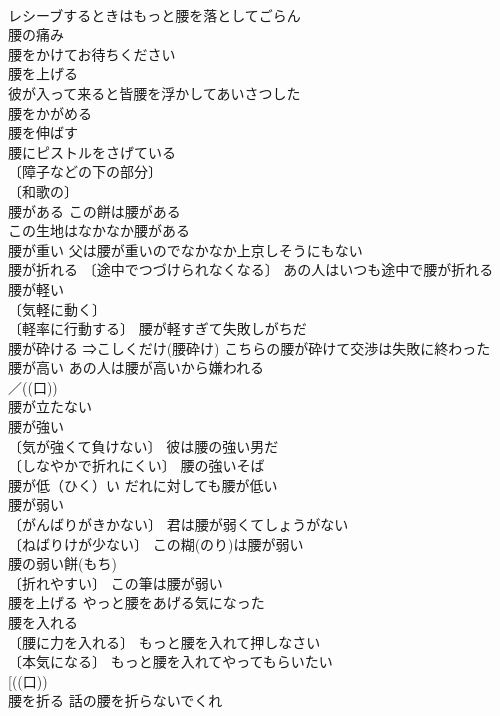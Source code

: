 \documentclass[8pt]{extreport}
\begin{document}
\begin{CJK}{UTF8}{min}
\\	レシーブするときはもっと腰を落としてごらん 
\\	腰の痛み 
\\	腰をかけてお待ちください 
\\	腰を上げる 
\\	彼が入って来ると皆腰を浮かしてあいさつした 
\\	腰をかがめる 
\\	腰を伸ばす 
\\	腰にピストルをさげている 
\\	〔障子などの下の部分〕
\\	〔和歌の〕
\\	腰がある この餅は腰がある 
\\	この生地はなかなか腰がある 
\\	腰が重い 父は腰が重いのでなかなか上京しそうにもない 
\\	腰が折れる 〔途中でつづけられなくなる〕 あの人はいつも途中で腰が折れる 
\\	腰が軽い 
\\	〔気軽に動く〕
\\	〔軽率に行動する〕 腰が軽すぎて失敗しがちだ 
\\	腰が砕ける ⇒こしくだけ(腰砕け) こちらの腰が砕けて交渉は失敗に終わった 
\\	腰が高い あの人は腰が高いから嫌われる 
\\	／((口)) 
\\	腰が立たない 
\\	腰が強い 
\\	〔気が強くて負けない〕 彼は腰の強い男だ 
\\	〔しなやかで折れにくい〕 腰の強いそば 
\\	腰が低（ひく）い だれに対しても腰が低い 
\\	腰が弱い 
\\	〔がんばりがきかない〕 君は腰が弱くてしょうがない 
\\	〔ねばりけが少ない〕 この糊(のり)は腰が弱い 
\\	腰の弱い餅(もち) 
\\	〔折れやすい〕 この筆は腰が弱い 
\\	腰を上げる やっと腰をあげる気になった 
\\	腰を入れる 
\\	〔腰に力を入れる〕 もっと腰を入れて押しなさい 
\\	〔本気になる〕 もっと腰を入れてやってもらいたい 
\\	[((口))
\\	腰を折る 話の腰を折らないでくれ 

\end{CJK}
\end{document}
